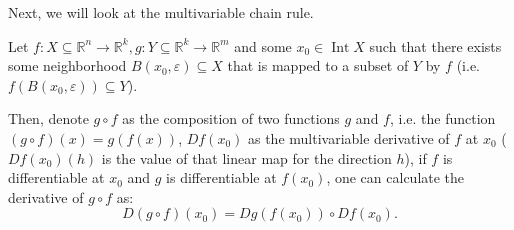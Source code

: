 Next, we will look at the multivariable chain rule.

\begin{theorem}
\label{thr:Multivariable chain rule}
  Let \( f: X \subseteq \mathbb{R}^{n} \to  \mathbb{R}^{k}, g: Y \subseteq
  \mathbb{R}^{k} \to \mathbb{R}^{m} \) and some \( x_{0} \in \operatorname{Int}
  X\) such that there exists some neighborhood \( B(x_{0}, \varepsilon)
  \subseteq X \) that is mapped to a subset of \( Y \) by \( f \) (i.e. \(
  f(B(x_{0}, \varepsilon)) \subseteq Y \)).

  Then, denote \( g \circ f \) as the composition of two functions \( g \) and
  \( f \), i.e. the function \( (g \circ f)(x) = g(f(x)) \), \( Df(x_{0}) \) as
  the multivariable derivative of \( f \) at \( x_{0} \) (\( Df(x_{0})(h) \) is
  the value of that linear map for the direction \( h \)), if \( f \) is
  differentiable at \( x_{0} \) and \( g \) is differentiable at \( f(x_{0}) \),
  one can calculate the derivative of \( g \circ f \) as:
  \[
    D(g \circ f)(x_{0}) = Dg(f(x_{0})) \circ Df(x_{0})
  .\] 
\end{theorem}

